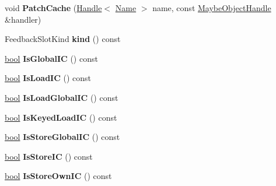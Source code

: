 \begin{DoxyCompactItemize}
\item 
\mbox{\label{classv8_1_1internal_1_1IC_a511f589958a4020eba654c22b9aa5b9f}} 
void {\bfseries Patch\+Cache} (\mbox{\hyperlink{classv8_1_1internal_1_1Handle}{Handle}}$<$ \mbox{\hyperlink{classv8_1_1internal_1_1Name}{Name}} $>$ name, const \mbox{\hyperlink{classv8_1_1internal_1_1MaybeObjectHandle}{Maybe\+Object\+Handle}} \&handler)
\item 
\mbox{\label{classv8_1_1internal_1_1IC_a8b5bd465d7121a9addc65b6f47c1e321}} 
Feedback\+Slot\+Kind {\bfseries kind} () const
\item 
\mbox{\label{classv8_1_1internal_1_1IC_aef996edfb7bdb8f31c5f7b6b66363cc3}} 
\mbox{\hyperlink{classbool}{bool}} {\bfseries Is\+Global\+IC} () const
\item 
\mbox{\label{classv8_1_1internal_1_1IC_a45de236df07db3b6362d03c7cfe9119b}} 
\mbox{\hyperlink{classbool}{bool}} {\bfseries Is\+Load\+IC} () const
\item 
\mbox{\label{classv8_1_1internal_1_1IC_a7547827a431def6b41ed9484bf233bb5}} 
\mbox{\hyperlink{classbool}{bool}} {\bfseries Is\+Load\+Global\+IC} () const
\item 
\mbox{\label{classv8_1_1internal_1_1IC_ab84dd07f99eb536f7d4e08e7c128185d}} 
\mbox{\hyperlink{classbool}{bool}} {\bfseries Is\+Keyed\+Load\+IC} () const
\item 
\mbox{\label{classv8_1_1internal_1_1IC_a4916bdf96d92457bc57891c26aba560d}} 
\mbox{\hyperlink{classbool}{bool}} {\bfseries Is\+Store\+Global\+IC} () const
\item 
\mbox{\label{classv8_1_1internal_1_1IC_a0f2f43df8d0eaf647ef0e955e841448c}} 
\mbox{\hyperlink{classbool}{bool}} {\bfseries Is\+Store\+IC} () const
\item 
\mbox{\label{classv8_1_1internal_1_1IC_ac8d87a48c33edf7dd1b0b1f1ed883ef4}} 
\mbox{\hyperlink{classbool}{bool}} {\bfseries Is\+Store\+Own\+IC} () const
\item 

\end{DoxyCompactItemize}
